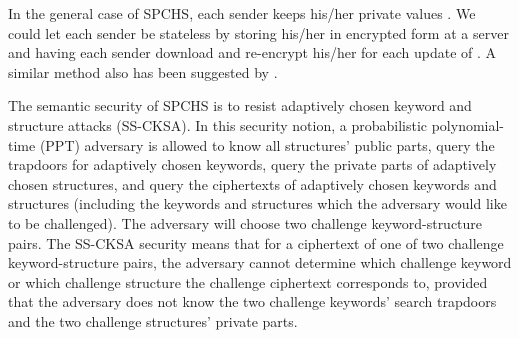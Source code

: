 \documentclass[10pt,twocolumn,twoside]{IEEEtran}
\begin{document}
In the general case of SPCHS, each sender keeps his/her private values . We could let each sender be stateless by storing his/her  in encrypted form at a server and having each sender download and re-encrypt his/her  for each update of . A similar method also has been suggested by \cite{CJJJKRS14}.

The semantic security of SPCHS is to resist adaptively chosen keyword and structure attacks (SS-CKSA). In this security notion, a probabilistic polynomial-time (PPT) adversary is allowed to know all structures' public parts, query the trapdoors for adaptively chosen keywords, query the private parts of adaptively chosen structures, and query the ciphertexts of adaptively chosen keywords and structures (including the keywords and structures which the adversary would like to be challenged). The adversary will choose two challenge keyword-structure pairs. The SS-CKSA security means that for a ciphertext of one of two challenge keyword-structure pairs, the adversary cannot determine which challenge keyword or which challenge structure the challenge ciphertext corresponds to, provided that the adversary does not know the two challenge keywords' search trapdoors and the two challenge structures' private parts.
\end{document}
